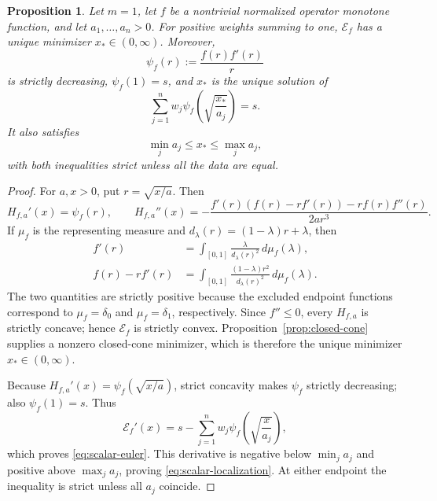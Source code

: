 \documentclass[11pt]{amsart}
\newtheorem{proposition}[theorem]{Proposition}
\theoremstyle{definition}
\theoremstyle{remark}
\begin{document}
\begin{proposition}
		\label{prop:scalar-barycenter}
		Let $m=1$, let $f$ be a nontrivial normalized operator monotone
		function, and let $a_1,\ldots,a_n>0$.  For positive weights summing to
		one, $\mathcal E_f$ has a unique minimizer $x_*\in(0,\infty)$.
		Moreover,
		\[
			\psi_f(r):=\frac{f(r)f'(r)}r
		\]
		is strictly decreasing, $\psi_f(1)=s$, and $x_*$ is the unique solution
		of
		\begin{equation}\label{eq:scalar-euler}
			\sum_{j=1}^n w_j
			\psi_f\!\left(\sqrt{\frac{x_*}{a_j}}\right)=s.
		\end{equation}
		It also satisfies
		\begin{equation}\label{eq:scalar-localization}
			\min_j a_j\le x_*\le\max_j a_j,
		\end{equation}
		with both inequalities strict unless all the data are equal.
	\end{proposition}
	
	\begin{proof}
		For $a,x>0$, put $r=\sqrt{x/a}$.  Then
		\[
			H_{f,a}'(x)=\psi_f(r),
			\qquad
			H_{f,a}''(x)
			=-\frac{f'(r)(f(r)-rf'(r))-rf(r)f''(r)}{2ar^3}.
		\]
		If $\mu_f$ is the representing measure and
		$d_\lambda(r)=(1-\lambda)r+\lambda$, then
		\begin{align*}
			f'(r)&=\int_{[0,1]}\frac{\lambda}{d_\lambda(r)^2}\,d\mu_f(\lambda),\\
			f(r)-rf'(r)
			&=\int_{[0,1]}\frac{(1-\lambda)r^2}{d_\lambda(r)^2}
			\,d\mu_f(\lambda).
		\end{align*}
		The two quantities are strictly positive because the excluded endpoint
		functions correspond to $\mu_f=\delta_0$ and $\mu_f=\delta_1$,
		respectively.  Since $f''\le0$, every $H_{f,a}$ is strictly concave;
		hence $\mathcal E_f$ is strictly convex.  Proposition~\ref{prop:closed-cone}
		supplies a nonzero closed-cone minimizer, which is therefore the unique
		minimizer $x_*\in(0,\infty)$.
		
		Because $H_{f,a}'(x)=\psi_f(\sqrt{x/a})$, strict concavity makes
		$\psi_f$ strictly decreasing; also $\psi_f(1)=s$.  Thus
		\[
			\mathcal E_f'(x)
			=s-\sum_{j=1}^n w_j
			\psi_f\!\left(\sqrt{\frac{x}{a_j}}\right),
		\]
		which proves \eqref{eq:scalar-euler}.  This derivative is negative below
		$\min_j a_j$ and positive above $\max_j a_j$, proving
		\eqref{eq:scalar-localization}.  At either endpoint the inequality is strict
		unless all $a_j$ coincide.
	\end{proof}
	
\end{document}
